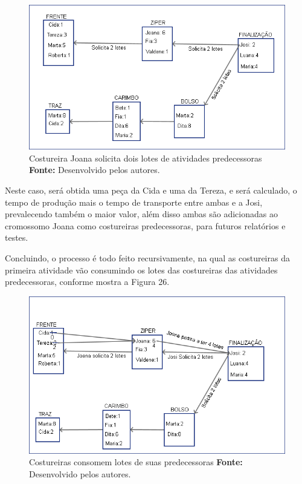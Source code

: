 \begin{figure}[h!]
	\centerline{\includegraphics[scale=0.5]{./imagens/processo_solciitacao_de_lotes2.png}}
	\caption[Costureira Joana solicita dois lotes de atividades predecessoras]
	{Costureira Joana solicita dois lotes de atividades predecessoras 
	\textbf{Fonte:} Desenvolvido pelos autores.}
	\label{fig:exemplo1}
\end{figure}

\newpage

\par Neste caso, será obtida uma peça da Cida e uma da Tereza, e será calculado,
o tempo de produção mais o tempo de transporte entre ambas e a Josi,
prevalecendo também o maior valor, além disso ambas são adicionadas ao
cromossomo Joana como costureiras predecessoras, para futuros relatórios e
testes.

\par Concluindo, o processo é todo feito recursivamente, na qual as costureiras
da primeira atividade vão consumindo os lotes das costureiras das atividades
predecessoras, conforme mostra a Figura 26.


\begin{figure}[h!]
	\centerline{\includegraphics[scale=0.6]{./imagens/processo_solciitacao_de_lotes3.png}}
	\caption[Costureiras consomem lotes de suas predecessoras]
	{Costureiras consomem lotes de suas predecessoras \textbf{Fonte:} Desenvolvido
	pelos autores.}
	\label{fig:exemplo1}
\end{figure}


